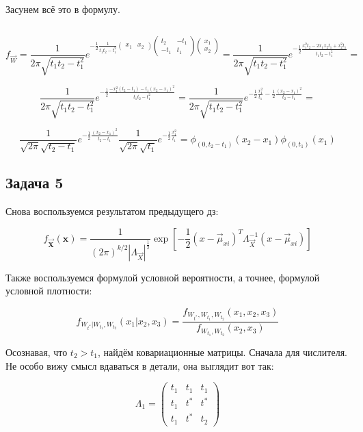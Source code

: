 \documentclass[a4paper,12pt]{article}
\begin{document}
Засунем всё это в формулу.

\[ \]

\[ f_{\vec{W}} = \frac{1}{2 \pi \sqrt{t_1 t_2 - t_1^2}} e^{-\frac{1}{2}  \frac{1}{t_1 t_2 - t_1^2} \begin{pmatrix}
	x_1 & x_2
	\end{pmatrix}
	\begin{pmatrix}
	t_2 & -t_1\\
	-t_1 & t_1
	\end{pmatrix} \begin{pmatrix}
	x_1\\
	x_2
	\end{pmatrix} }  = \frac{1}{2 \pi \sqrt{t_1 t_2 - t_1^2}} e^{-\frac{1}{2}  \frac{ x_1^2 t_2 - 2 x_1 x_2 t_1 + x_2^2 t_1 }{t_1 t_2 - t_1^2}} =  \]


\[ 
\frac{1}{2 \pi \sqrt{t_1 t_2 - t_1^2}} e^{-\frac{1}{2}  \frac{ - x_1^2(t_2 - t_1) - t_1(x_2 - x_1) ^ 2 }{t_1 t_2 - t_1^2}}  =  \frac{1}{2 \pi \sqrt{t_1 t_2 - t_1^2}} e^{  -\frac{1}{2} \frac{x_1^2}{t_1} - \frac{1}{2} \frac{(x_2 - x_1)^2}{t_2 - t_1} } = 
 \]
 
 \[ \frac{1}{\sqrt{2 \pi} \sqrt{t_2 - t_1}} e^{  - \frac{1}{2} \frac{(x_2 - x_1)^2}{t_2 - t_1} } \frac{1}{\sqrt{2 \pi} \sqrt{t_1}} e^{  -\frac{1}{2} \frac{x_1^2}{t_1}   } = \phi_{\left(0, t_{2}-t_{1}\right)}\left(x_{2}-x_{1}\right) \phi_{\left(0, t_{1}\right)}\left(x_{1}\right)
 \]
\subsection{Задача 5}

Снова воспользуемся результатом предыдущего дз:

\[
f_{\mathbf{\vec{X}}}(\boldsymbol{x})=\frac{1}{(2 \pi)^{k / 2}\left|\Lambda_{\vec{X}}\right|^{\frac{1}{2}}} \exp \left[-\frac{1}{2}\left(x-\vec{\mu}_{xi}\right)^T\Lambda_{\vec{X}}^{-1}\left(x-\vec{\mu}_{xi} \right)\right]
\]

Также воспользуемся формулой условной вероятности, а точнее, формулой условной плотности:

\[ f_{W_{t^*}|W_{t_1}, W_{t_2}} (x_1|x_2,x_3) = \frac{f_{W_{t^*}, W_{t_1}, W_{t_2}} (x_1, x_2,x_3)}{f_{W_{t_1}, W_{t_2}} (x_2,x_3)} \]


Осознавая, что $ t_2 > t_1 $, найдём ковариационные матрицы. Сначала для числителя. Не особо вижу смысл вдаваться в детали, она выглядит вот так:

\[ \Lambda_1 = \begin{pmatrix}
t_1 & t_1 & t_1 \\
t_1 & t^* & t^* \\
t_1 & t^* & t_2
\end{pmatrix} \]
\end{document}
